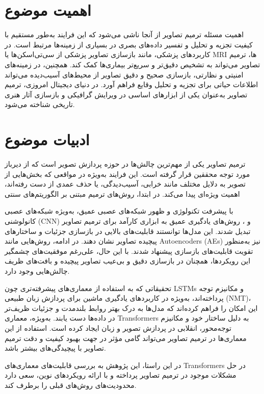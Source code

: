 \section{اهمیت موضوع}
اهمیت مسئله ترمیم تصاویر از آنجا ناشی می‌شود که این فرایند به‌طور مستقیم با کیفیت تجزیه و تحلیل و تفسیر داده‌های بصری در بسیاری از زمینه‌ها مرتبط است. در کاربردهای پزشکی، مانند بازسازی تصاویر پزشکی از سی‌تی‌اسکن‌ها یا MRI‌ ها، ترمیم تصاویر می‌تواند به تشخیص دقیق‌تر و سریع‌تر بیماری‌ها کمک کند. همچنین، در زمینه‌های امنیتی و نظارتی، بازسازی صحیح و دقیق تصاویر از محیط‌های آسیب‌دیده می‌تواند اطلاعات حیاتی برای تجزیه و تحلیل وقایع فراهم آورد. در دنیای دیجیتال امروزی، ترمیم تصاویر به‌عنوان یکی از ابزارهای اساسی در ویرایش گرافیکی و بازسازی آثار هنری تاریخی شناخته می‌شود.


\section{ادبیات موضوع}
ترمیم تصاویر یکی از مهم‌ترین چالش‌ها در حوزه پردازش تصویر است که از دیرباز مورد توجه محققین قرار گرفته است. این فرایند به‌ویژه در مواقعی که بخش‌هایی از تصویر به دلایل مختلف مانند خرابی، آسیب‌دیدگی، یا حذف عمدی از دست رفته‌اند، اهمیت ویژه‌ای پیدا می‌کند. در ابتدا، روش‌های ترمیم مبتنی بر الگوریتم‌های سنتی 

با پیشرفت تکنولوژی و ظهور شبکه‌های عصبی عمیق، به‌ویژه شبکه‌های عصبی کانولوشنی (CNN) و ، روش‌های یادگیری عمیق به ابزاری کارآمد برای ترمیم تصاویر تبدیل شدند. این مدل‌ها توانستند قابلیت‌های بالایی در بازسازی جزئیات و ساختارهای پیچیده تصاویر نشان دهند. در ادامه، روش‌هایی مانند Autoencoders (AEs) نیز به‌منظور تقویت قابلیت‌های بازسازی پیشنهاد شدند. با این حال، علی‌رغم موفقیت‌های چشمگیر این رویکردها، همچنان در بازسازی دقیق و بی‌عیب تصاویر پیچیده و بافت‌های ظریف چالش‌هایی وجود دارد.

تحقیقاتی که به استفاده از معماری‌های پیشرفته‌تری چون LSTMs و مکانیزم توجه پرداخته‌اند، به‌ویژه در کاربردهای یادگیری ماشین برای پردازش زبان طبیعی (NMT)، این امکان را فراهم کرده‌اند که مدل‌ها به درک بهتر روابط بلندمدت و جزئیات ظریف‌تر در داده‌ها دست یابند. به‌ویژه، معماری Transformers به دلیل ساختار خود و مکانیزم توجه‌محور، انقلابی در پردازش تصویر و زبان ایجاد کرده است. استفاده از این معماری‌ها در ترمیم تصاویر می‌تواند گامی مؤثر در جهت بهبود کیفیت و دقت ترمیم تصاویر با پیچیدگی‌های بیشتر باشد.

در این راستا، این پژوهش به بررسی قابلیت‌های معماری‌های Transformers در حل مشکلات موجود در ترمیم تصاویر پرداخته و با ارائه رویکردهای نوین، سعی دارد محدودیت‌های روش‌های قبلی را برطرف کند.



